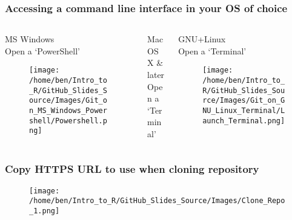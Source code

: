 \documentclass[xcolor=dvipsnames]{beamer}
\begin{document}
\begin{frame}
\frametitle{Accessing a command line interface in your OS of choice}

\begin{columns}

\begin{column}{3.3cm}

\begin{center}
MS Windows\\
Open a `PowerShell'

\begin{figure}
\texttt{[image: /home/ben/Intro\_to\_R/GitHub\_Slides\_Source/Images/Git\_on\_MS\_Windows\_Powershell/Powershell.png]}
\end{figure}

\end{center}

\end{column} 

\begin{column}{3.3cm}
Mac OS X \& later\\
Open a `Terminal'
\end{column} 

\begin{column}{3.3cm}

\begin{center}
GNU+Linux\\
Open a `Terminal'

\begin{figure}
\texttt{[image: /home/ben/Intro\_to\_R/GitHub\_Slides\_Source/Images/Git\_on\_GNU\_Linux\_Terminal/Launch\_Terminal.png]}
\end{figure}

\end{center}

\end{column} 

\end{columns}
\end{frame}

\begin{frame}
\frametitle{Copy HTTPS URL to use when cloning repository}
\begin{center}
\begin{figure}
\texttt{[image: /home/ben/Intro\_to\_R/GitHub\_Slides\_Source/Images/Clone\_Repo\_1.png]}
\end{figure}
\end{center}
\end{frame}
\end{document}
